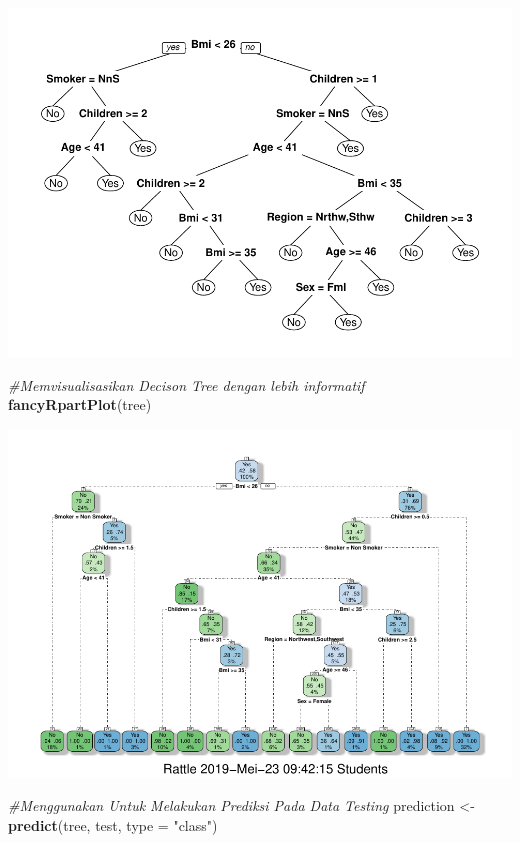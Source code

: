 \documentclass[]{article}
\newenvironment{Shaded}{\begin{snugshade}}{\end{snugshade}}
\newcommand{\CommentTok}[1]{\textcolor[rgb]{0.56,0.35,0.01}{\textit{#1}}}
\newcommand{\DataTypeTok}[1]{\textcolor[rgb]{0.13,0.29,0.53}{#1}}
\newcommand{\KeywordTok}[1]{\textcolor[rgb]{0.13,0.29,0.53}{\textbf{#1}}}
\newcommand{\NormalTok}[1]{#1}
\newcommand{\StringTok}[1]{\textcolor[rgb]{0.31,0.60,0.02}{#1}}
\begin{document}
\includegraphics{2_Classification_Model_files/figure-latex/unnamed-chunk-7-1.pdf}

\begin{Shaded}
\begin{Highlighting}[]
\CommentTok{#Memvisualisasikan Decison Tree dengan lebih informatif}
\KeywordTok{fancyRpartPlot}\NormalTok{(tree)}
\end{Highlighting}
\end{Shaded}

\includegraphics{2_Classification_Model_files/figure-latex/unnamed-chunk-8-1.pdf}

\begin{Shaded}
\begin{Highlighting}[]
\CommentTok{#Menggunakan Untuk Melakukan Prediksi Pada Data Testing}
\NormalTok{prediction <-}\StringTok{ }\KeywordTok{predict}\NormalTok{(tree, test, }\DataTypeTok{type =} \StringTok{"class"}\NormalTok{)}
\end{Highlighting}
\end{Shaded}
\end{document}

